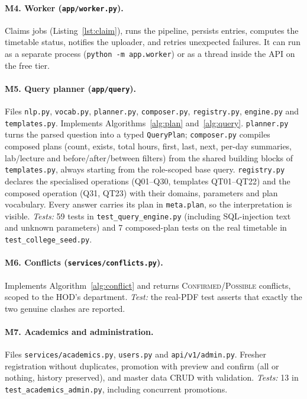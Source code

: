 \paragraph{M4. Worker (\texttt{app/worker.py}).}
Claims jobs (Listing~\ref{lst:claim}), runs the pipeline, persists entries, computes the timetable
status, notifies the uploader, and retries unexpected failures. It can run as a separate process
(\texttt{python -m app.worker}) or as a thread inside the API on the free tier.

\paragraph{M5. Query planner (\texttt{app/query}).} Files \texttt{nlp.py}, \texttt{vocab.py}, \texttt{planner.py},
\texttt{composer.py}, \texttt{registry.py}, \texttt{engine.py} and \texttt{templates.py}.
Implements Algorithms~\ref{alg:plan} and~\ref{alg:query}. \texttt{planner.py} turns the parsed question
into a typed \texttt{QueryPlan}; \texttt{composer.py} compiles composed plans (count, exists, total
hours, first, last, next, per-day summaries, lab/lecture and before/after/between filters) from the
shared building blocks of \texttt{templates.py}, always starting from the role-scoped base query.
\texttt{registry.py} declares the specialised operations (Q01--Q30, templates QT01--QT22) and the
composed operation (Q31, QT23) with their domains, parameters and plan vocabulary. Every answer carries
its plan in \texttt{meta.plan}, so the interpretation is visible. \emph{Tests:} 59 tests in
\texttt{test\_query\_engine.py} (including SQL-injection text and unknown parameters) and 7 composed-plan
tests on the real timetable in \texttt{test\_college\_seed.py}.

\paragraph{M6. Conflicts (\texttt{services/conflicts.py}).}
Implements Algorithm~\ref{alg:conflict} and returns \textsc{Confirmed}/\textsc{Possible} conflicts,
scoped to the HOD's department. \emph{Test:} the real-PDF test asserts that exactly the two genuine clashes
are reported.

\paragraph{M7. Academics and administration.} Files \texttt{services/academics.py}, \texttt{users.py} and \texttt{api/v1/admin.py}.
Fresher registration without duplicates, promotion with preview and confirm (all or nothing, history
preserved), and master data CRUD with validation. \emph{Tests:} 13 in \texttt{test\_academics\_admin.py}, including
concurrent promotions.

